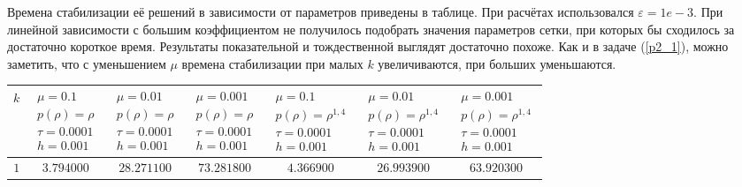     Времена стабилизации её решений в зависимости от параметров приведены в таблице. При расчётах использовался $\varepsilon = 1e-3$. При линейной зависимости с большим коэффициентом не получилось подобрать значения параметров сетки, при которых бы сходилось за достаточно короткое время. Результаты показательной и тождественной выглядят достаточно похоже. Как и в задаче (\ref{p2_1}), можно заметить, что с уменьшением $\mu$ времена стабилизации при малых $k$ увеличиваются, при больших уменьшаются.


\begin{landscape}
\begin{tabular}{|c|c|c|c|c|c|c|}
\hline
$k$          & $\begin{array}{c}\mu = 0.1\\p(\rho) = \rho\\\tau = 0.0001\\h = 0.001\end{array}$ & $\begin{array}{c}\mu = 0.01\\p(\rho) = \rho\\\tau = 0.0001\\h = 0.001\end{array}$ & $\begin{array}{c}\mu = 0.001\\p(\rho) = \rho\\\tau = 0.0001\\h = 0.001\end{array}$ & $\begin{array}{c}\mu = 0.1\\p(\rho) = \rho^{1,4}\\\tau = 0.0001\\h = 0.001\end{array}$ & $\begin{array}{c}\mu = 0.01\\p(\rho) = \rho^{1,4}\\\tau = 0.0001\\h = 0.001\end{array}$ & \multicolumn{1}{c|}{$\begin{array}{c}\mu = 0.001\\p(\rho) = \rho^{1,4}\\\tau = 0.0001\\h = 0.001\end{array}$} \\ \hline
$1$          & $3.794000$                                                   & $28.271100$                                                  & $73.281800$                                                  & $4.366900$                                                         & $26.993900$                                                        & \multicolumn{1}{c|}{$63.920300$}                                                        \\ \hline

\end{tabular}
\end{landscape}
